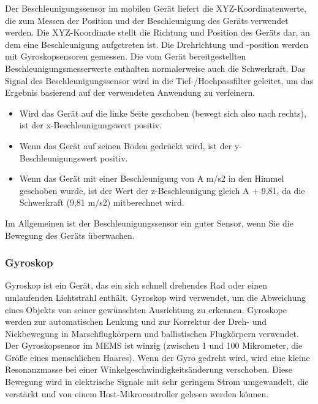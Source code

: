 Der Beschleunigungssensor im mobilen Gerät liefert die XYZ-Koordinatenwerte, die zum Messen der Position und der Beschleunigung des Geräts verwendet werden. Die XYZ-Koordinate stellt die Richtung und Position des Geräts dar, an dem eine Beschleunigung aufgetreten ist. Die Drehrichtung und -position werden mit Gyroskopsensoren gemessen. Die vom Gerät bereitgestellten Beschleunigungsmesserwerte enthalten normalerweise auch die Schwerkraft. Das Signal des Beschleunigungssensor wird in die Tief-/Hochpassfilter geleitet, um das Ergebnis basierend auf der verwendeten Anwendung zu verfeinern. \cite{Sathish2021}
\begin{itemize}
	\item Wird das Gerät auf die linke Seite geschoben (bewegt sich also nach rechts), ist der x-Beschleunigungswert positiv.
	\item Wenn das Gerät auf seinen Boden gedrückt wird, ist der y-Beschleunigungswert positiv.
	\item Wenn das Gerät mit einer Beschleunigung von A m/s2 in den Himmel geschoben wurde, ist der Wert der z-Beschleunigung gleich A + 9,81, da die Schwerkraft (9,81 m/s2) mitberechnet wird.
\end{itemize}
Im Allgemeinen ist der Beschleunigungssensor ein guter Sensor, wenn Sie die Bewegung des Geräts überwachen. \cite{DevelopersMotionSen}

%
%
%
%
\subsubsection{Gyroskop}

Gyroskop ist ein Gerät, das ein sich schnell drehendes Rad oder einen umlaufenden Lichtstrahl enthält. Gyroskop wird verwendet, um die Abweichung eines Objekts von seiner gewünschten Ausrichtung zu erkennen. Gyroskope werden zur automatischen Lenkung und zur Korrektur der Dreh- und Nickbewegung in Marschflugkörpern und ballistischen Flugkörpern verwendet.\cite{RogersGyro}
Der Gyroskopsensor im MEMS ist winzig (zwischen 1 und 100 Mikrometer, die Größe eines menschlichen Haares). Wenn der Gyro gedreht wird, wird eine kleine Resonanzmasse bei einer Winkelgeschwindigkeitsänderung verschoben. Diese Bewegung wird in elektrische Signale mit sehr geringem Strom umgewandelt, die verstärkt und von einem Host-Mikrocontroller gelesen werden können.\cite{sparkfunGyro}





%
%
%
%

